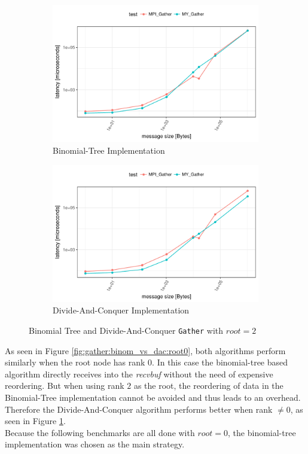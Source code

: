 \begin{figure}[H]
  \centering
  \begin{subfigure}[b]{0.49\textwidth}
        \includegraphics[width=\textwidth]{../benchmarks/openmpi/root=2/binom/gather_32/runtime.pdf}
        \caption{Binomial-Tree Implementation}
    \end{subfigure}
    \begin{subfigure}[b]{0.49\textwidth}
        \includegraphics[width=\textwidth]{../benchmarks/openmpi/root=2/divide_conquer/gather_32/runtime.pdf}
        \caption{Divide-And-Conquer Implementation}
    \end{subfigure}
    \caption{Binomial Tree and Divide-And-Conquer \texttt{Gather} with $root = 2$}
    \label{fig:gather:binom_vs_dac:root2}
\end{figure}

\noindent As seen in Figure \ref{fig:gather:binom_vs_dac:root0}, both algorithms perform similarly when the root node has rank $0$. In this case the binomial-tree based algorithm directly receives into the \textit{recvbuf} without the need of expensive reordering. But when using rank $2$ as the root, the reordering of data in the Binomial-Tree implementation cannot be avoided and thus leads to an overhead. Therefore the Divide-And-Conquer algorithm performs better when rank $\neq 0$, as seen in Figure \ref{fig:gather:binom_vs_dac:root2}.\\
Because the following benchmarks are all done with $root = 0$, the binomial-tree implementation was chosen as the main strategy.

